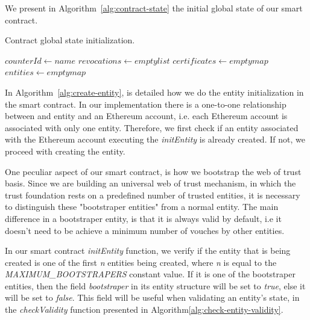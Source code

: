 We present in Algorithm~\ref{alg:contract-state} the initial global state of our smart contract.

\begin{algorithm}
  \caption{Contract global state initialization.}
  \label{alg:contract-state}
  \begin{algorithmic}
    \State $counterId \gets name$ 
    \State $revocations \gets empty list$ 
    \State $certificates \gets empty map$ 
    \State $entities \gets empty map$ 
  \end{algorithmic}
\end{algorithm}

In Algorithm~\ref{alg:create-entity}, is detailed how we do the entity initialization in the smart contract.
In our implementation there is a one-to-one relationship between and entity and an Ethereum account, i.e. each Ethereum account is associated with only one entity.
Therefore, we first check if an entity associated with the Ethereum account executing the \textit{initEntity} is already created.
If not, we proceed with creating the entity.

One peculiar aspect of our smart contract, is how we bootstrap the web of trust basis.
Since we are building an universal web of trust mechanism, in which the trust foundation rests on a predefined number of trusted entities, it is necessary to distinguish these "bootstraper entities" from a normal entity.
The main difference in a bootstraper entity, is that it is always valid by default, i.e it doesn't need to be achieve a minimum number of vouches by other entities.

In our smart contract \textit{initEntity} function, we verify if the entity that is being created is one of the first \textit{n} entities being created, where \textit{n} is equal to the \textit{MAXIMUM\_BOOTSTRAPERS} constant value.
If it is one of the bootstraper entities, then the field \textit{bootstraper} in its entity structure will be set to \textit{true}, else it will be set to \textit{false}.
This field will be useful when validating an entity's state, in the \textit{checkValidity} function presented in Algorithm\ref{alg:check-entity-validity}.

